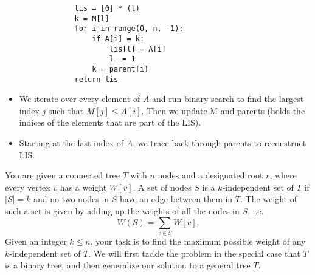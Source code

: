 \documentclass[11pt]{article}
\begin{document}
\begin{subparts}
\begin{solution}
\begin{verbatim}
                lis = [0] * (l)
                k = M[l]
                for i in range(0, n, -1):
                    if A[i] = k:
                        lis[l] = A[i]
                        l -= 1
                    k = parent[i]
                return lis
        \end{verbatim}
        \begin{itemize}
            \item We iterate over every element of $A$ and run binary search to find the largest index $j$
            such that $M[j] \le A[i]$. Then we update M and parents (holds the indices of the elements that are part of the LIS).
            \item Starting at the last index of $A$, we trace back through parents to reconstruct LIS.
        \end{itemize}
    \end{solution}
\end{subparts}

\newpage


You are given a connected tree $T$ with $n$ nodes and a designated root $r$, where every vertex $v$ has a weight $W[v]$. A set of nodes $S$ is a $k$-independent set of $T$ if $|S| = k$ and no two nodes in $S$ have an edge between them in $T$. The weight of such a set is given by adding up the weights of all the nodes in $S$, i.e. 
\[W(S) = \sum_{v \in S} W[v].\] Given an integer $k \leq n$, your task is to find the maximum possible weight of any $k$-independent set of $T$. We will first tackle the problem in the special case that $T$ is a binary tree, and then generalize our solution to a general tree $T$.
\end{document}

